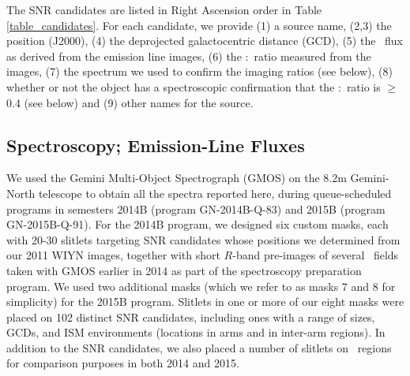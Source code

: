 
The SNR candidates are listed in Right Ascension order in Table \ref{table_candidates}.  For each candidate, we provide (1) a source name, (2,3) the position  (J2000), (4) the deprojected galactocentric distance (GCD), (5) the \ha\ flux as derived from the emission line images, (6) the \sii:\ha\ ratio measured from the images, (7) the spectrum we used to confirm the imaging ratios (see below), (8) whether or not the object has a spectroscopic confirmation that the  \sii:\ha\ ratio is $\ge$ 0.4 (see below) and (9) other names for the source.


\subsection{Spectroscopy; Emission-Line Fluxes}


We used the Gemini Multi-Object Spectrograph (GMOS) on the 8.2m Gemini-North telescope to obtain all the spectra reported here, during queue-scheduled programs in semesters 2014B (program GN-2014B-Q-83) and 2015B (program GN-2015B-Q-91).  
For the 2014B program, we designed six custom masks, each with 20-30 slitlets targeting SNR candidates whose positions we determined from our 2011 WIYN images, together with  short $R$-band pre-images of several \gal\ fields taken with GMOS earlier in 2014 as part of the spectroscopy preparation program.    
We used two additional masks (which we refer to as masks 7 and 8 for simplicity)  for the 2015B program.  Slitlets in one or more of our eight masks were placed on 102 distinct SNR candidates, including ones with a range of sizes, GCDs, and ISM environments (locations in arms and in 
inter-arm regions).  In addition to the SNR candidates, we also placed a number of slitlets on \hii\ regions for comparison purposes in both 2014 and 2015.

